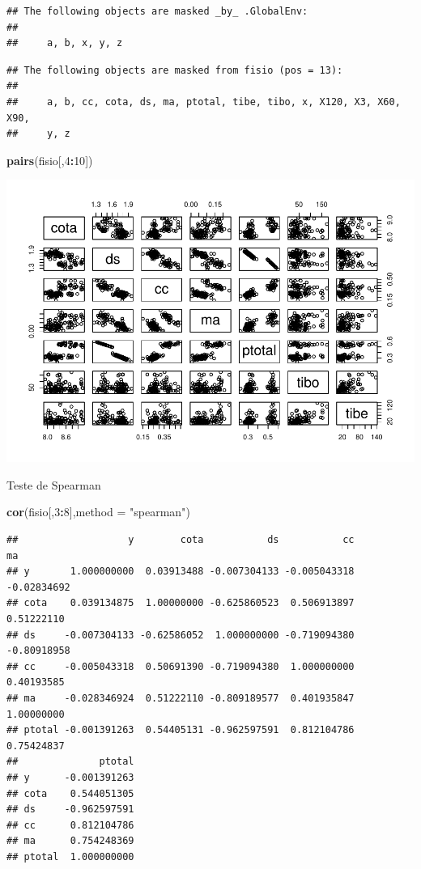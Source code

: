 \documentclass[
]{book}
\newenvironment{Shaded}{\begin{snugshade}}{\end{snugshade}}
\newcommand{\DataTypeTok}[1]{\textcolor[rgb]{0.13,0.29,0.53}{#1}}
\newcommand{\DecValTok}[1]{\textcolor[rgb]{0.00,0.00,0.81}{#1}}
\newcommand{\KeywordTok}[1]{\textcolor[rgb]{0.13,0.29,0.53}{\textbf{#1}}}
\newcommand{\NormalTok}[1]{#1}
\newcommand{\OperatorTok}[1]{\textcolor[rgb]{0.81,0.36,0.00}{\textbf{#1}}}
\newcommand{\StringTok}[1]{\textcolor[rgb]{0.31,0.60,0.02}{#1}}
\begin{document}
\begin{verbatim}
## The following objects are masked _by_ .GlobalEnv:
## 
##     a, b, x, y, z
\end{verbatim}

\begin{verbatim}
## The following objects are masked from fisio (pos = 13):
## 
##     a, b, cc, cota, ds, ma, ptotal, tibe, tibo, x, X120, X3, X60, X90,
##     y, z
\end{verbatim}

\begin{Shaded}
\begin{Highlighting}[]
\KeywordTok{pairs}\NormalTok{(fisio[,}\DecValTok{4}\OperatorTok{:}\DecValTok{10}\NormalTok{])}
\end{Highlighting}
\end{Shaded}

\includegraphics{TudodoR_files/figure-latex/unnamed-chunk-274-1.pdf}

Teste de Spearman

\begin{Shaded}
\begin{Highlighting}[]
\KeywordTok{cor}\NormalTok{(fisio[,}\DecValTok{3}\OperatorTok{:}\DecValTok{8}\NormalTok{],}\DataTypeTok{method =} \StringTok{"spearman"}\NormalTok{)}
\end{Highlighting}
\end{Shaded}

\begin{verbatim}
##                   y        cota           ds           cc          ma
## y       1.000000000  0.03913488 -0.007304133 -0.005043318 -0.02834692
## cota    0.039134875  1.00000000 -0.625860523  0.506913897  0.51222110
## ds     -0.007304133 -0.62586052  1.000000000 -0.719094380 -0.80918958
## cc     -0.005043318  0.50691390 -0.719094380  1.000000000  0.40193585
## ma     -0.028346924  0.51222110 -0.809189577  0.401935847  1.00000000
## ptotal -0.001391263  0.54405131 -0.962597591  0.812104786  0.75424837
##              ptotal
## y      -0.001391263
## cota    0.544051305
## ds     -0.962597591
## cc      0.812104786
## ma      0.754248369
## ptotal  1.000000000
\end{verbatim}
\end{document}
